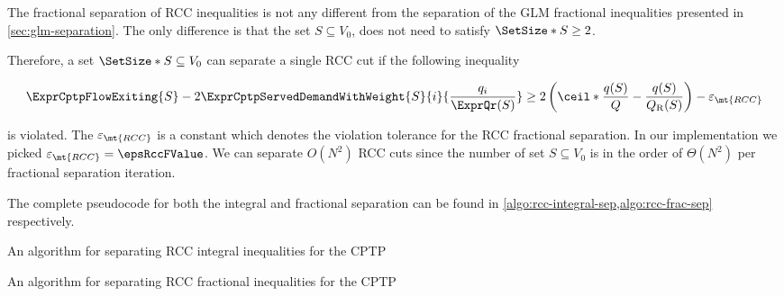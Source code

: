 The fractional separation of RCC inequalities is not any different from the separation of the GLM fractional inequalities presented in \cref{sec:glm-separation}.
The only difference is that the set $S \subseteq V_0$, does not need to satisfy $\SetSize*{S} \ge 2$.

Therefore, a set $\SetSize*{S} \subseteq V_0$ can separate a single RCC cut if the following inequality

\begin{equation}
	\begin{split}
		\ExprCptpFlowExiting{S} -2 \ExprCptpServedDemandWithWeight{S}{i}{\frac{q_i}{\ExprQr(S)}}    \ge   2 \left( \ceil*{ \frac{q(S)}{Q}} - \frac{q(S)}{Q_{\mathrm{R}}(S)} \right) - \varepsilon_{\mt{RCC}}
	\end{split}
\end{equation}

is violated.
The $\varepsilon_{\mt{RCC}}$ is a constant which denotes the violation tolerance for the RCC fractional separation.
In our implementation we picked $\varepsilon_{\mt{RCC}} = \epsRccFValue$.
We can separate $O(N^2)$ RCC cuts since the number of set $S \subseteq V_0$ is in the order of $\Theta(N^2)$ per fractional separation iteration.

The complete pseudocode for both the integral and fractional separation can be found in \cref{algo:rcc-integral-sep,algo:rcc-frac-sep} respectively.

\begin{algorithm}
	\caption{An algorithm for separating RCC integral inequalities for the CPTP}
	\label{algo:rcc-integral-sep}
	
\end{algorithm}

\begin{algorithm}
	\caption{An algorithm for separating RCC fractional inequalities for the CPTP}
	\label{algo:rcc-frac-sep}
	
\end{algorithm}

